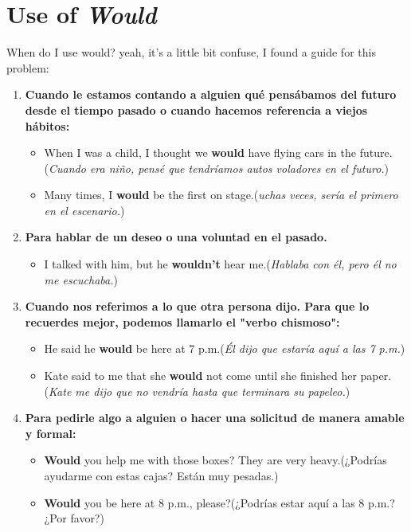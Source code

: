 \documentclass[
	11pt, %
	fleqn, %
	a4paper, %
]{LegrandOrangeBook}
\begin{document}
\section{Use of \textit{Would}}
When do I use would? yeah, it's a little bit confuse, I found a guide for this problem:
\begin{enumerate}
\item \textbf{Cuando le estamos contando a alguien qué pensábamos del futuro desde el tiempo pasado o cuando hacemos referencia a viejos hábitos:}
\begin{itemize}
\item When I was a child, I thought we \textbf{would} have flying cars in the future.(\textit{Cuando era niño, pensé que tendríamos autos voladores en el futuro.})
\item Many times, I \textbf{would} be the first on stage.(\textit{uchas veces, sería el primero en el escenario.})
\end{itemize}
\item \textbf{Para hablar de un deseo o una voluntad en el pasado.}
\begin{itemize}
\item I talked with him, but he \textbf{wouldn't} hear me.(\textit{Hablaba con él, pero él no me escuchaba.})
\end{itemize}
\item \textbf{Cuando nos referimos a lo que otra persona dijo. Para que lo recuerdes mejor, podemos llamarlo el "verbo chismoso":}
\begin{itemize}
\item He said he \textbf{would} be here at 7 p.m.(\textit{Él dijo que estaría aquí a las 7 p.m.})
\item Kate said to me that she \textbf{would} not come until she finished her paper.(\textit{Kate me dijo que no vendría hasta que terminara su papeleo.})
\end{itemize}
\item \textbf{Para pedirle algo a alguien o hacer una solicitud de manera amable y formal:}
\begin{itemize}
\item \textbf{Would} you help me with those boxes? They are very heavy.(¿Podrías ayudarme con estas cajas? Están muy pesadas.)
\item \textbf{Would} you be here at 8 p.m., please?(¿Podrías estar aquí a las 8 p.m.? ¿Por favor?)
\end{itemize}
\end{enumerate}
\end{document}
